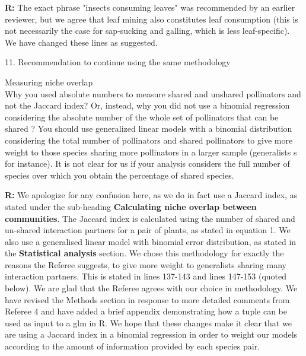 \documentclass[12pt]{letter}
\newenvironment{refquote}{\bigskip \begin{it}}{\end{it}\smallskip}
\begin{document}
		\textbf{R:} The exact phrase "insects consuming leaves" was recommended by an earlier reviewer, but we agree that leaf mining also constitutes leaf consumption (this is not necessarily the case for sap-sucking and galling, which is less leaf-specific). We have changed these lines as suggested.


	11. Recommendation to continue using the same methodology

		\begin{refquote}
			Measuring niche overlap\\
			Why you used absolute numbers to measure shared and unshared pollinators and not the Jaccard index? Or, instead, why you did not use a binomial regression considering the absolute number of the whole set of pollinators that can be shared ? You should use generalized linear models with a binomial distribution considering the total number of pollinators and shared pollinators to give more weight to those species sharing more pollinators in a larger sample (generalists s for instance). It is not clear for us if your analysis considers the full number of species over which you obtain the percentage of shared species.
		\end{refquote}

		\textbf{R:} We apologize for any confusion here, as we do in fact use a Jaccard index, as stated under the sub-heading \textbf{Calculating niche overlap between communities}.
		The Jaccard index is calculated using the number of shared and un-shared interaction partners for a pair of plants, as stated in equation 1. We also use a generalised linear model with binomial error distribution, as stated in the \textbf{Statistical analysis} section. We chose this methodology for exactly the reasons the Referee suggests, to give more weight to generalists sharing many interaction partners. This is stated in lines 137-143 and lines 147-153 (quoted below). We are glad that the Referee agrees with our choice in methodology. We have revised the Methods section in response to more detailed comments from Referee 4 and have added a brief appendix demonstrating how a tuple can be used as input to a glm in R. We hope that these changes make it clear that we are using a Jaccard index in a binomial regression in order to weight our models according to the amount of information provided by each species pair.
\end{document}
